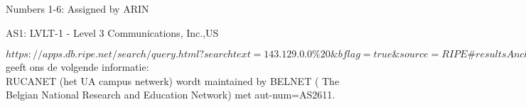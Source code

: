 Numbers 1-6: Assigned by ARIN

AS1: LVLT-1 - Level 3 Communications, Inc.,US

$https://apps.db.ripe.net/search/query.html?searchtext=143.129.0.0\%20\&bflag=true\&source=RIPE\#resultsAnchor$ \\
geeft ons de volgende informatie:\\
RUCANET (het UA campus netwerk) wordt maintained by BELNET ( The Belgian National Research and Education Network) met aut-num=AS2611.
